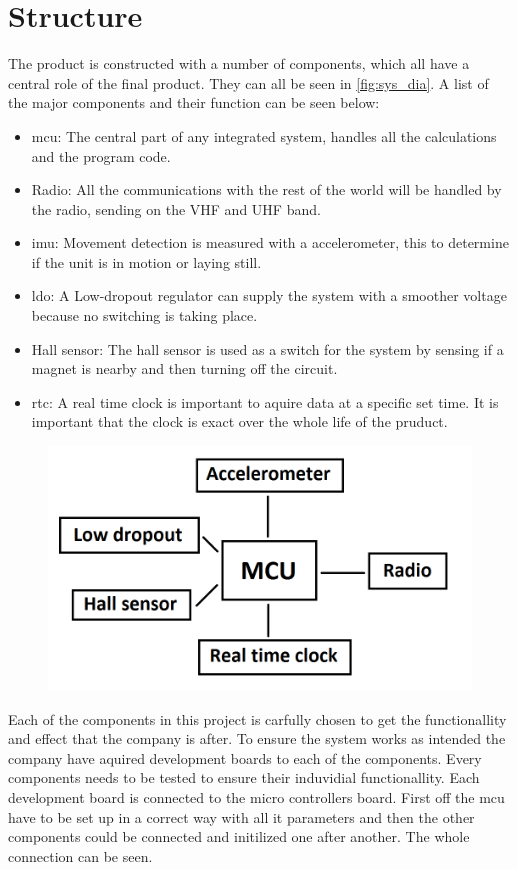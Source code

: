 \section{Structure}
The product is constructed with a number of components, which all have a central role of the final product. They can all be seen in \autoref{fig:sys_dia}. A list of the major components and their function can be seen below:

\begin{itemize}[noitemsep] 
\item \gls{mcu}: The central part of any integrated system, handles all the calculations and the program code.
\item Radio: All the communications with the rest of the world will be handled by the radio, sending on the VHF and UHF band.
\item \gls{imu}: Movement detection is measured with a accelerometer, this to determine if the unit is  in motion or laying still. 
\item \gls{ldo}: A Low-dropout regulator can supply the system with a smoother voltage because no switching is taking place.
\item Hall sensor: The hall sensor is used as a switch for the system by sensing if a magnet is nearby and then turning off the circuit.
\item \gls{rtc}: A real time clock is important to aquire data at a specific set time. It is important that the clock is exact over the whole life of the pruduct.
\end{itemize} 


\begin{figure}[H] 
	\centering 
	\includegraphics[width=.8\linewidth]{Figures/System_diagram} 
	\label{fig:sys_dia} 
\end{figure} 

Each of the components in this project is carfully chosen to get the functionallity and effect that the company is after. To ensure the system works as intended the company have aquired development boards to each of the components. Every components needs to be tested to ensure their induvidial functionallity. Each development board is connected to the micro controllers board. First off the \gls{mcu} have to be set up in a correct way with all it parameters and then the other components could be connected and initilized one after another. The whole connection can be seen. %

